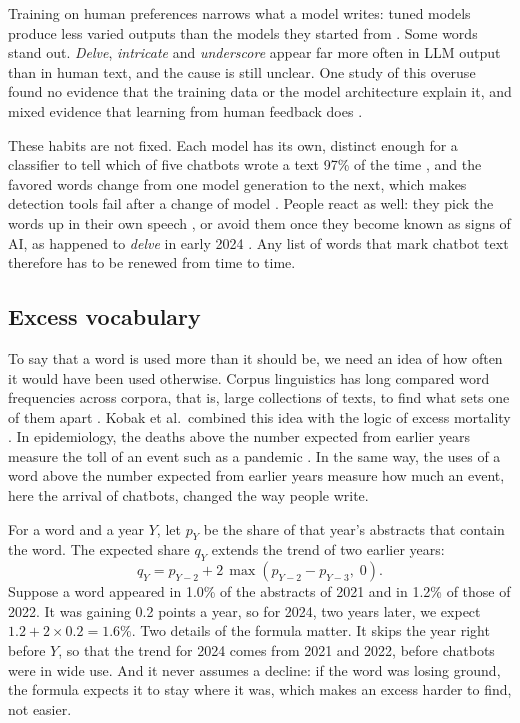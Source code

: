 \documentclass[12pt]{article}
\newcommand{\w}[1]{\textit{#1}}
\begin{document}
Training on human preferences narrows what a model writes: tuned models produce less varied outputs
than the models they started from \cite{kirk2024understanding}. Some words stand out. \w{Delve},
\w{intricate} and \w{underscore} appear far more often in LLM output than in human text, and the
cause is still unclear. One study of this overuse found no evidence that the training data or the
model architecture explain it, and mixed evidence that learning from human feedback does
\cite{juzek2025delve}.

These habits are not fixed. Each model has its own, distinct enough for a classifier to tell which
of five chatbots wrote a text 97\% of the time \cite{sun2025idiosyncrasies}, and the favored words
change from one model generation to the next, which makes detection tools fail after a change of
model \cite{nakajima2026turnover}. People react as well: they pick the words up in their own speech
\cite{yakura2024empirical}, or avoid them once they become known as signs of AI, as happened to
\w{delve} in early 2024 \cite{geng2025coevolution}. Any list of words that mark chatbot text
therefore has to be renewed from time to time.

\subsection{Excess vocabulary}
\label{sec:excess-theory}

To say that a word is used more than it should be, we need an idea of how often it would have been
used otherwise. Corpus linguistics has long compared word frequencies across corpora, that is,
large collections of texts, to find what sets one of them apart \cite{rayson2000comparing}. Kobak et
al.\ combined this idea with the logic of excess mortality \cite{kobak2025delving}. In epidemiology,
the deaths above the number expected from earlier years measure the toll of an event such as a
pandemic \cite{karlinsky2021tracking}. In the same way, the uses of a word above the number expected
from earlier years measure how much an event, here the arrival of chatbots, changed the way people
write.

For a word and a year $Y$, let $p_Y$ be the share of that year's abstracts that contain the word.
The expected share $q_Y$ extends the trend of two earlier years:
\begin{equation}
  q_Y = p_{Y-2} + 2\,\max\left(p_{Y-2} - p_{Y-3},\; 0\right).
  \label{eq:expected}
\end{equation}
Suppose a word appeared in 1.0\% of the abstracts of 2021 and in 1.2\% of those of 2022. It was
gaining 0.2 points a year, so for 2024, two years later, we expect $1.2 + 2 \times 0.2 = 1.6\%$.
Two details of the formula matter. It skips the year right before $Y$, so that the trend for 2024
comes from 2021 and 2022, before chatbots were in wide use. And it never assumes a decline: if the
word was losing ground, the formula expects it to stay where it was, which makes an excess harder
to find, not easier.
\end{document}
